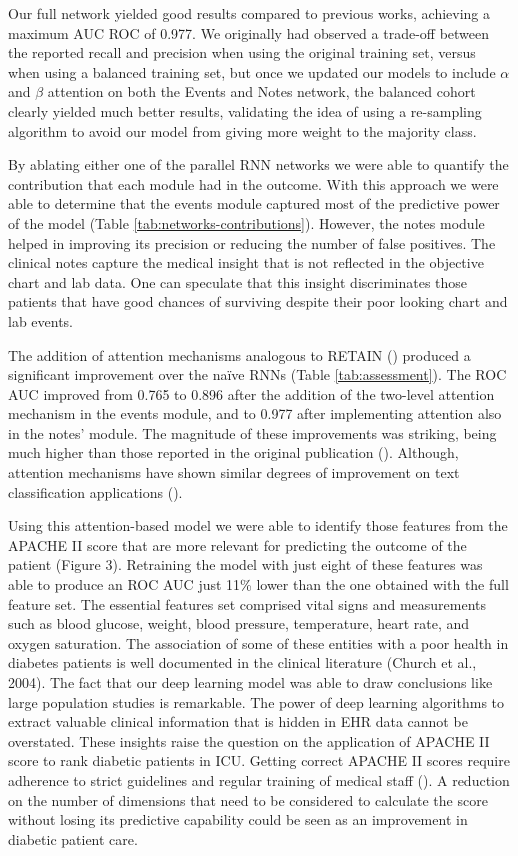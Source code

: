 \documentclass{sigkddExp}
\begin{document}
Our full network yielded good results compared to previous works, 
achieving a maximum AUC ROC of 0.977. We originally had observed a 
trade-off between the reported recall and precision when using the 
original training set, versus when using a balanced training set, 
but once we updated our models to include $\alpha$ and $\beta$ attention on both 
the Events and Notes network, the balanced cohort clearly yielded 
much better results, validating the idea of using a re-sampling 
algorithm to avoid our model from giving more weight to the majority class.

By ablating either one of the parallel RNN networks we were able to 
quantify the contribution that each module had in the outcome. With 
this approach we were able to determine that the events module 
captured most of the predictive power of the model (Table \ref{tab:networks-contributions}).  However, 
the notes module helped in improving its precision or reducing the number 
of false positives.  The clinical notes capture the medical insight 
that is not reflected in the objective chart and lab data.  One can 
speculate that this insight discriminates those patients that have 
good chances of surviving despite their poor looking chart and lab events.

The addition of attention mechanisms analogous to \textsc{RETAIN} 
(\cite{choi}) produced a significant improvement over the na\"ive 
RNNs (Table \ref{tab:assessment}).  The ROC AUC improved from 0.765 to 0.896 after 
the addition of the two-level attention mechanism in the events 
module, and to 0.977 after implementing attention also in the notes’ 
module. The magnitude of these improvements was striking, being much 
higher than those reported in the original publication (\cite{choi}).  
Although, attention mechanisms have shown similar degrees of improvement 
on text classification applications (\cite{minaee}).

Using this attention-based model we were able to identify those 
features from the APACHE II score that are more relevant for predicting 
the outcome of the patient (Figure 3).  Retraining the model with 
just eight of these features was able to produce an ROC AUC just 11\% 
lower than the one obtained with the full feature set.  The essential 
features set comprised vital signs and measurements such as blood glucose, 
weight, blood pressure, temperature, heart rate, and oxygen saturation.  
The association of some of these entities with a poor health in diabetes 
patients is well documented in the clinical literature (Church et al., 2004).  
The fact that our deep learning model was able to draw conclusions like large 
population studies is remarkable.  The power of deep learning algorithms 
to extract valuable clinical information that is hidden in EHR data cannot 
be overstated.  These insights raise the question on the application of 
APACHE II score to rank diabetic patients in ICU.  Getting correct APACHE II 
scores require adherence to strict guidelines and regular training of 
medical staff (\cite{polderman}).  A reduction on the number 
of dimensions that need to be considered to calculate the score without 
losing its predictive capability could be seen as an improvement in diabetic 
patient care.
\end{document}
